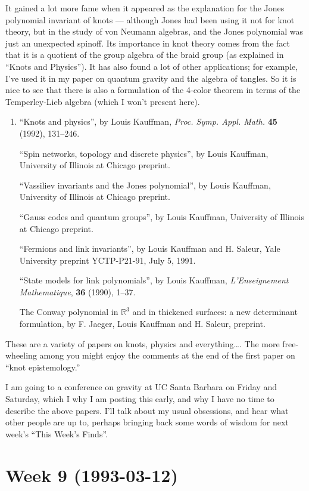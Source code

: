 \documentclass{article}
\begin{document}
It gained a lot more fame when it appeared as the explanation for the
Jones polynomial invariant of knots --- although Jones had been using it
not for knot theory, but in the study of von Neumann algebras, and the
Jones polynomial was just an unexpected spinoff. Its importance in knot
theory comes from the fact that it is a quotient of the group algebra of
the braid group (as explained in ``Knots and Physics''). It has also
found a lot of other applications; for example, I've used it in my paper
on quantum gravity and the algebra of tangles. So it is nice to see that
there is also a formulation of the 4-color theorem in terms of the
Temperley-Lieb algebra (which I won't present here).

\begin{enumerate}
\def\labelenumi{\arabic{enumi})}
\setcounter{enumi}{1}
\item
  ``Knots and physics'', by Louis Kauffman, \emph{Proc. Symp. Appl.
  Math.} \textbf{45} (1992), 131--246.

  ``Spin networks, topology and discrete physics'', by Louis Kauffman,
  University of Illinois at Chicago preprint.

  ``Vassiliev invariants and the Jones polynomial'', by Louis Kauffman,
  University of Illinois at Chicago preprint.

  ``Gauss codes and quantum groups'', by Louis Kauffman, University of
  Illinois at Chicago preprint.

  ``Fermions and link invariants'', by Louis Kauffman and H. Saleur,
  Yale University preprint YCTP-P21-91, July 5, 1991.

  ``State models for link polynomials'', by Louis Kauffman,
  \emph{L'Enseignement Mathematique}, \textbf{36} (1990), 1--37.

  The Conway polynomial in \(\mathbb{R}^3\) and in thickened surfaces: a
  new determinant formulation, by F. Jaeger, Louis Kauffman and H.
  Saleur, preprint.
\end{enumerate}

These are a variety of papers on knots, physics and everything\ldots.
The more free-wheeling among you might enjoy the comments at the end of
the first paper on ``knot epistemology.''

I am going to a conference on gravity at UC Santa Barbara on Friday and
Saturday, which I why I am posting this early, and why I have no time to
describe the above papers. I'll talk about my usual obsessions, and hear
what other people are up to, perhaps bringing back some words of wisdom
for next week's ``This Week's Finds''.
\hypertarget{week9}{%
\section{Week 9 (1993-03-12)}\label{week9}}
\end{document}
